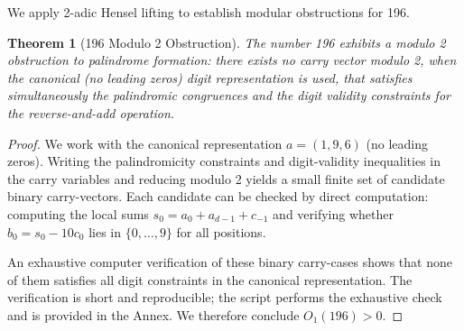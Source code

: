 \documentclass[12pt,a4paper]{article}
\newtheorem{theorem}{Theorem}[section]
\begin{document}
We apply 2-adic Hensel lifting to establish modular obstructions for 196.

\begin{theorem}[196 Modulo 2 Obstruction]%
The number 196 exhibits a modulo 2 obstruction to palindrome formation: there exists no carry vector modulo 2, when the canonical (no leading zeros) digit representation is used, that satisfies simultaneously the palindromic congruences and the digit validity constraints for the reverse-and-add operation.
\end{theorem}

\begin{proof}
We work with the canonical representation $a=(1,9,6)$ (no leading zeros). Writing the palindromicity constraints and digit-validity inequalities in the carry variables and reducing modulo 2 yields a small finite set of candidate binary carry-vectors. Each candidate can be checked by direct computation: computing the local sums $s_0=a_0+a_{d-1}+c_{-1}$ and verifying whether $b_0=s_0-10c_0$ lies in $\{0,\ldots,9\}$ for all positions.

An exhaustive computer verification of these binary carry-cases shows that none of them satisfies all digit constraints in the canonical representation. The verification is short and reproducible; the script \texttt{} performs the exhaustive check and is provided in the Annex. We therefore conclude $O_1(196)>0$.
\end{proof}
\end{document}
